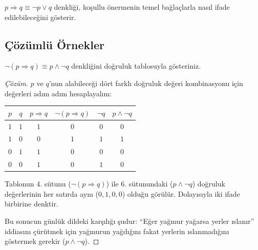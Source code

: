 $p \Rightarrow q \equiv \neg p \lor q$ denkliği, koşullu önermenin temel bağlaçlarla nasıl ifade edilebileceğini gösterir.

\subsection{Çözümlü Örnekler}

\begin{example}
$\neg(p \Rightarrow q) \equiv p \land \neg q$ denkliğini doğruluk tablosuyla gösteriniz.
\end{example}
\begin{proof}[Çözüm]
$p$ ve $q$'nun alabileceği dört farklı doğruluk değeri kombinasyonu için değerleri adım adım hesaplayalım:

\begin{table}[htbp]
\centering
\begin{tabular}{cc|c|c|c|c}
\toprule
$p$ & $q$ & $p \Rightarrow q$ & $\neg(p \Rightarrow q)$ & $\neg q$ & $p \land \neg q$ \\
\midrule
$1$ & $1$ & $1$ & $0$ & $0$ & $0$ \\
$1$ & $0$ & $0$ & $1$ & $1$ & $1$ \\
$0$ & $1$ & $1$ & $0$ & $0$ & $0$ \\
$0$ & $0$ & $1$ & $0$ & $1$ & $0$ \\
\bottomrule
\end{tabular}
\end{table}

Tablonun 4. sütunu ($\neg(p \Rightarrow q)$) ile 6. sütunundaki ($p \land \neg q$) doğruluk değerlerinin her satırda aynı ($0, 1, 0, 0$) olduğu görülür. Dolayısıyla iki ifade birbirine denktir.

Bu sonucun günlük dildeki karşılığı şudur: ``Eğer yağmur yağarsa yerler ıslanır'' iddiasını çürütmek için yağmurun yağdığını fakat yerlerin ıslanmadığını göstermek gerekir ($p \land \neg q$).
\end{proof}


